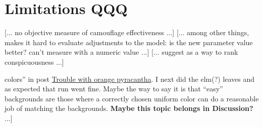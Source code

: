 \documentclass[acmtog]{acmart}
\begin{document}
\section{Limitations QQQ}
[... no objective measure of camouflage effectiveness ...]
[... among other things, makes it hard to evaluate adjustments to the model: is the new parameter value better? can't measure with a numeric value ...]
[... suggest  \cite{lv_cod_2022} as a way to rank conspicuousness ...]
\par
[... See blog entry: \href{https://cwreynolds.github.io/TexSyn/#20220930}{Reliability: what \textit{is} the likelihood of camouflage?} see also comment “Perhaps the common issue is large areas of nearly uniform [but contrasting] colors” in post \href{https://cwreynolds.github.io/TexSyn/#20221119}{Trouble with orange pyracantha}. I next did the elm(?) leaves and as expected that run went fine. Maybe the way to say it is that “easy” backgrounds are those where a correctly chosen uniform color can do a reasonable job of matching the backgrounds. \textbf{Maybe this topic belongs in Discussion?} ...]
\par
[... all results are hand selected, “cherry picked” ...] 
\par
[... in email to Ken I wrote: \textit{The aspect of my project I'm unsure how to approach is lack of rigor. My evaluations are all subjective. It comes down to “we can see that the effectiveness of the camouflage clearly increases during the simulation.”}]
\par
[... inherently 2d ...]
\par
[... texture synthesis lacks genetic or biological plausibility ...]
\par

\end{document}
